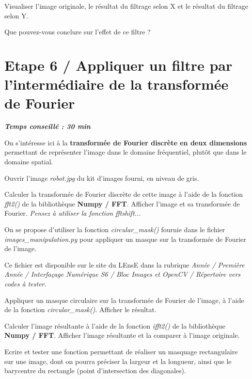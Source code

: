 \documentclass[a4paper,11pt,titlepage]{article} %
\begin{document}
\Manip Visualiser l'image originale, le résultat du filtrage selon X et le résultat du filtrage selon Y.

\Quest Que pouvez-vous conclure sur l'effet de ce filtre ?

\section{Etape 6 / Appliquer un filtre par l'intermédiaire de la transformée de Fourier}

\begin{center} \textbf{\textit{Temps conseillé : 30 min}} \end{center}

On s'intéresse ici à la \textbf{transformée de Fourier discrète en deux dimensions} permettant de représenter l'image dans le domaine fréquentiel, plutôt que dans le domaine spatial.

\Manip Ouvrir l'image \textsl{robot.jpg} du kit d'images fourni, en niveau de gris.

\Manip Calculer la transformée de Fourier discrète de cette image à l'aide de la fonction \textsl{fft2()} de la bibliothèque \textbf{Numpy / FFT}. Afficher l'image et sa transformée de Fourier. \textit{Pensez à utiliser la fonction fftshift...}

\medskip

On se propose d'utiliser la fonction \textsl{circular\_mask()} fournie dans le fichier \textsl{images\_manipulation.py} pour appliquer un masque sur la transformée de Fourier de l'image. 

Ce fichier est disponible sur le site du LEnsE dans la rubrique \textit{Année / Première Année / Interfaçage Numérique S6 / Bloc Images et OpenCV / Répertoire vers codes à tester}.

\Manip Appliquer un masque circulaire sur la transformée de Fourier de l'image, à l'aide de la fonction \textsl{circular\_mask()}. Afficher le résultat.

\Manip Calculer l'image résultante à l'aide de la fonction \textit{ifft2()} de la bibliothèque \textbf{Numpy / FFT}. Afficher l'image résultante et la comparer à l'image originale.

\medskip

\Manip Ecrire et tester une fonction permettant de réaliser un masquage rectangulaire sur une image, dont on pourra préciser la largeur et la longueur, ainsi que le barycentre du rectangle (point d'intersection des diagonales).
\end{document}
